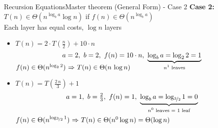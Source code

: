 \begin{frame}{Recursion Equations}{Master theorem (General Form) - Case 2}
  \textbf{Case 2:}
  {\color{Mittel-Gruen}$T(n) \in \Theta(n^{\log_b a} \log n)$}
  \hspace{1.5em} if {\color{Mittel-Blau}
    $f(n) \in \Theta(n^{\log_b a})$
  }\\
  {\color{gray}Each layer has equal costs, $\log n$ layers}
  \vspace{1.0em}
  \begin{itemize}
    \item<3->
      $T(n) = 2 \cdot T(\tfrac{n}{2}) + 10 \cdot n$
      \vspace{-0.5em}
      \begin{displaymath}
        a = 2, ~ b = 2, ~ f(n) = 10 \cdot n, ~
        \smash{\underbrace{
          \log_b a = \log_2 2 = 1
        }_{\text{$n^1$ leaves}}}
      \end{displaymath}
      {\color{Mittel-Blau}\begin{math}
        f(n) \in \Theta(n^{\log_2 2})$
        $\Rightarrow$
        $T(n) \in \Theta(n \, \log n)
      \end{math}}
      \vspace{1.0em}
    \item<4->
      $T(n) = T(\tfrac{2\,n}{3}) + 1$
      \vspace{-0.5em}
      \begin{displaymath}
        a = 1, ~ b = \tfrac{2}{3}, ~ f(n) = 1, ~
        \smash{\underbrace{
          \log_b a = \log_{\nicefrac{3}{2}} 1 = 0
        }_{\text{$n^0$ leaves $=$ 1 leaf}}}
      \end{displaymath}
      \hfill\\[1.0em]
      {\color{Mittel-Blau}\begin{math}
        f(n) \in \Theta(n^{\log_{\nicefrac{3}{2}} 1})$
        $\Rightarrow$
        $T(n) \in \Theta(n^0 \log n) = \Theta(\log n)
      \end{math}}
  \end{itemize}
\end{frame}


